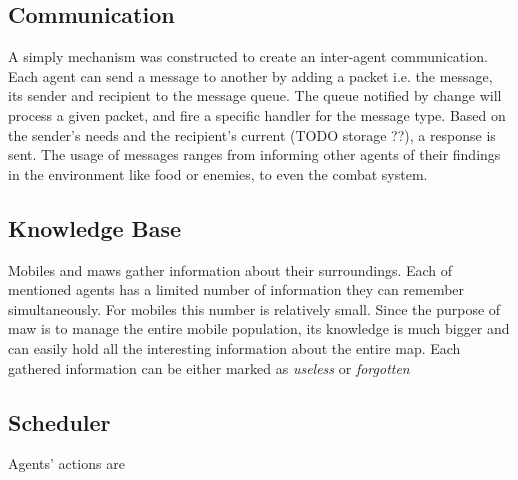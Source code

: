 \documentclass[conference]{IEEEtran}
\begin{document}
\subsection{Communication}
A simply mechanism was constructed to create an inter-agent communication.
Each agent can send a message to another by adding a packet i.e. the message, its sender and 
recipient to the message queue.
The queue notified by change will process a given packet, and fire a specific handler for the message type.
Based on the sender's needs and the recipient's current (TODO storage ??), a response is sent.
The usage of messages ranges from informing other agents of their findings in the environment like food or enemies, to even the combat system.









\subsection{Knowledge Base}

Mobiles and maws gather information about their surroundings. 
Each of mentioned agents has a limited number of information they can remember simultaneously.
For mobiles this number is relatively small. Since the purpose of maw is to manage the entire mobile population, its knowledge is much bigger and can easily hold all the interesting information about the entire map.
Each gathered information can be either marked as \textit{useless} or \textit{forgotten}









\subsection{Scheduler}
Agents' actions are 
\end{document}
